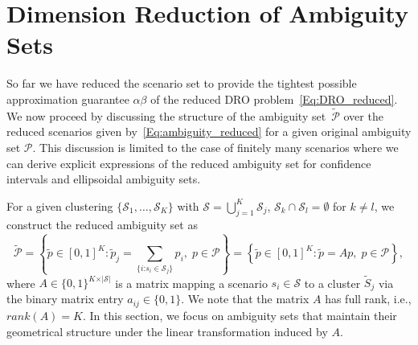 \documentclass{article}
\newcommand{\mP}{\mathcal{P}}
\newcommand{\mS}{\mathcal{S}}
\newcommand{\R}{\mathbb{R}}
\begin{document}


\section{Dimension Reduction of Ambiguity Sets}
\label{sec:dimen_red_amb_sets}
So far we have reduced the scenario set to provide the tightest possible approximation guarantee \(\alpha \beta\) of the reduced DRO problem~\eqref{Eq:DRO_reduced}.
We now proceed by discussing the structure of the ambiguity set~\(\tilde{\mP}\) over the reduced scenarios given by~\eqref{Eq:ambiguity_reduced} for a given original ambiguity set \(\mP\). 
This discussion is limited to the case of finitely many scenarios where we can derive explicit expressions of the reduced ambiguity set for confidence intervals and ellipsoidal ambiguity sets. 

For a given clustering $\{\mS_1,\ldots,\mS_K\}$ with \(\mS=\bigcup_{j=1}^{K}{\mS}_j\), \({\mS}_k \cap {\mS}_l = \emptyset\) for $k \neq l$, we construct the reduced ambiguity set as
\begin{equation}
	\tilde{\mP}= \left\{\tilde{p}\in[0,1]^{K} : \tilde{p}_j = \textstyle\sum_{\{ i\text{:}s_i \in \mS_j\}} p_i,\; p\in\mP\right\} = \left\{\tilde{p}\in[0,1]^{K} :\tilde{p} = Ap,\; p\in\mP\right\}, \label{Eq:reduced_ambiguity}
\end{equation}
where $A\in\{0,1\}^{K \times \vert \mS \vert}$ is a matrix mapping a scenario $s_i \in \mS$ to a cluster $\tilde{S}_j$ via the binary matrix entry $a_{ij}\in\{0,1\}$.
We note that the matrix $A$ has full rank, i.e., $rank(A)=K$.
In this section, we focus on ambiguity sets that maintain their geometrical structure under the linear transformation induced by \(A\).

\end{document}
